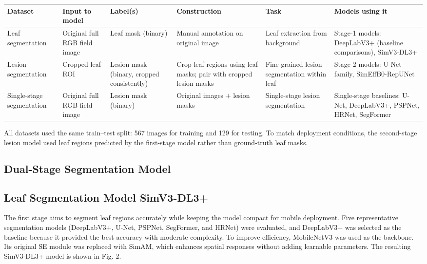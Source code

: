 \documentclass[
]{article}
\begin{document}
\begin{longtable}[]{@{}llllll@{}}
\toprule
Dataset & Input to model & Label(s) & Construction & Task & Models using
it \\
\midrule
\endhead
Leaf segmentation & Original full RGB field image & Leaf mask (binary) &
Manual annotation on original image & Leaf extraction from background &
Stage-1 models: DeepLabV3+ (baseline comparisons), SimV3-DL3+ \\
Lesion segmentation & Cropped leaf ROI & Lesion mask (binary, cropped
consistently) & Crop leaf regions using leaf masks; pair with cropped
lesion masks & Fine-grained lesion segmentation within leaf & Stage-2
models: U-Net family, SimEffB0-RepUNet \\
Single-stage segmentation & Original full RGB field image & Lesion mask
(binary) & Original images + lesion masks & Single-stage lesion
segmentation & Single-stage baselines: U-Net, DeepLabV3+, PSPNet, HRNet,
SegFormer \\
\bottomrule
\end{longtable}

All datasets used the same train--test split: 567 images for training
and 129 for testing. To match deployment conditions, the second-stage
lesion model used leaf regions predicted by the first-stage model rather
than ground-truth leaf masks.

\hypertarget{dual-stage-segmentation-model}{%
\subsection{Dual-Stage Segmentation
Model}\label{dual-stage-segmentation-model}}

\hypertarget{leaf-segmentation-model-simv3-dl3}{%
\subsection{Leaf Segmentation Model
SimV3-DL3+}\label{leaf-segmentation-model-simv3-dl3}}

The first stage aims to segment leaf regions accurately while keeping the
model compact for mobile deployment. Five representative segmentation
models (DeepLabV3+, U-Net, PSPNet, SegFormer, and HRNet) were evaluated,
and DeepLabV3+ was selected as the baseline because it provided the best
accuracy with moderate complexity. To improve efficiency, MobileNetV3 was
used as the backbone. Its original SE module was replaced with SimAM,
which enhances spatial responses without adding learnable parameters.
The resulting SimV3-DL3+ model is shown in Fig. 2.
\end{document}
